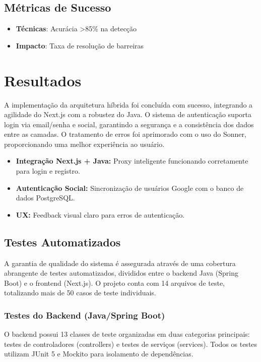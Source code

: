 \documentclass[12pt,a4paper]{article}
\begin{document}
\subsection{Métricas de Sucesso}
\begin{itemize}
    \item \textbf{Técnicas}: Acurácia >85\% na detecção
    \item \textbf{Impacto}: Taxa de resolução de barreiras
\end{itemize}

\section{Resultados}
\label{sec:resultados}

A implementação da arquitetura híbrida foi concluída com sucesso, integrando a agilidade do Next.js com a robustez do Java. O sistema de autenticação suporta login via email/senha e social, garantindo a segurança e a consistência dos dados entre as camadas. O tratamento de erros foi aprimorado com o uso do Sonner, proporcionando uma melhor experiência ao usuário.

\begin{itemize}
    \item \textbf{Integração Next.js + Java:} Proxy inteligente funcionando corretamente para login e registro.
    \item \textbf{Autenticação Social:} Sincronização de usuários Google com o banco de dados PostgreSQL.
    \item \textbf{UX:} Feedback visual claro para erros de autenticação.
\end{itemize}

\subsection{Testes Automatizados}
\label{subsec:testes}

A garantia de qualidade do sistema é assegurada através de uma cobertura abrangente de testes automatizados, divididos entre o backend Java (Spring Boot) e o frontend (Next.js). O projeto conta com 14 arquivos de teste, totalizando mais de 50 casos de teste individuais.

\subsubsection{Testes do Backend (Java/Spring Boot)}

O backend possui 13 classes de teste organizadas em duas categorias principais: testes de controladores (controllers) e testes de serviços (services). Todos os testes utilizam JUnit 5 e Mockito para isolamento de dependências.
\end{document}
